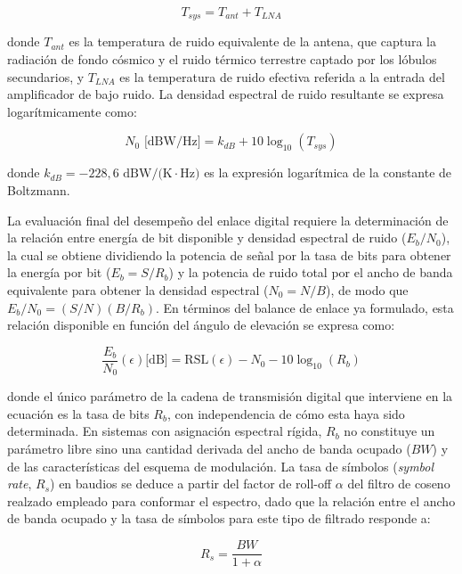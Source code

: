 \begin{equation}
    T_{sys} = T_{ant} + T_{LNA}
    \label{eq:tsys}
\end{equation}

donde $T_{ant}$ es la temperatura de ruido equivalente de la antena, que captura la radiación de fondo cósmico y el ruido térmico terrestre captado por los lóbulos secundarios, y $T_{LNA}$ es la temperatura de ruido efectiva referida a la entrada del amplificador de bajo ruido. La densidad espectral de ruido resultante se expresa logarítmicamente como:

\begin{equation}
    N_0 \text{ [dBW/Hz]} = k_{dB} + 10 \log_{10}(T_{sys})
    \label{eq:n0_log}
\end{equation}

donde $k_{dB} = -228{,}6 \text{ dBW/(K}\cdot\text{Hz)}$ es la expresión logarítmica de la constante de Boltzmann.

La evaluación final del desempeño del enlace digital requiere la determinación de la relación entre energía de bit disponible y densidad espectral de ruido ($E_b/N_0$), la cual se obtiene dividiendo la potencia de señal por la tasa de bits para obtener la energía por bit ($E_b = S/R_b$) y la potencia de ruido total por el ancho de banda equivalente para obtener la densidad espectral ($N_0 = N/B$), de modo que $E_b/N_0 = (S/N)(B/R_b)$. En términos del balance de enlace ya formulado, esta relación disponible en función del ángulo de elevación se expresa como:

\begin{equation}
    \frac{E_b}{N_0}(\epsilon) \text{[dB]} = \text{RSL}(\epsilon) - N_0 - 10\log_{10}(R_b)
    \label{eq:ebn0_rb}
\end{equation}

donde el único parámetro de la cadena de transmisión digital que interviene en la ecuación es la tasa de bits $R_b$, con independencia de cómo esta haya sido determinada. En sistemas con asignación espectral rígida, $R_b$ no constituye un parámetro libre sino una cantidad derivada del ancho de banda ocupado ($BW$) y de las características del esquema de modulación. La tasa de símbolos (\textit{symbol rate}, $R_s$) en baudios se deduce a partir del factor de roll-off $\alpha$ del filtro de coseno realzado empleado para conformar el espectro, dado que la relación entre el ancho de banda ocupado y la tasa de símbolos para este tipo de filtrado responde a:

\begin{equation}
    R_s = \frac{BW}{1 + \alpha}
    \label{eq:rs_bw}
\end{equation}

